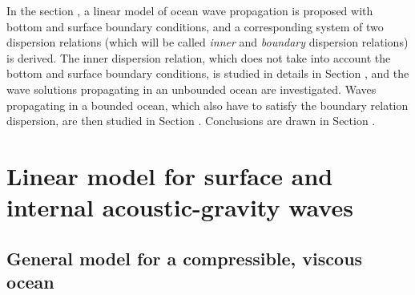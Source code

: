 \documentclass[a4paper,11pt]{article}
\begin{document}
In the section , a linear model of ocean wave propagation is proposed with bottom and surface boundary conditions, and a corresponding system of two dispersion relations (which will be called {\it inner} and {\it boundary} dispersion relations) is derived. The inner dispersion relation, which does not take into account the bottom and surface boundary conditions, is studied in details in Section , and the wave solutions propagating in an unbounded ocean are investigated. Waves propagating in a bounded ocean, which also have to satisfy the boundary relation dispersion, are then studied in Section . Conclusions are drawn in Section .



\section{Linear model for surface and internal acoustic-gravity waves}
\label{SectionLinModels}

\subsection{General model for a compressible, viscous ocean}
\label{SubSectionNSModel}
\end{document}
